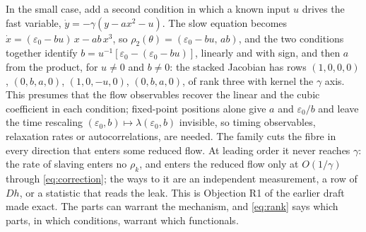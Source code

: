 \documentclass[10pt]{article}
\begin{document}
In the small case, add a second condition in which a known input $u$ drives the fast variable, $\dot y=-\gamma(y-ax^2-u)$. The slow equation becomes $\dot x=(\varepsilon_0-bu)\,x-ab\,x^3$, so $\rho_2(\theta)=(\varepsilon_0-bu,\,ab)$, and the two conditions together identify $b=u^{-1}[\varepsilon_0-(\varepsilon_0-bu)]$, linearly and with sign, and then $a$ from the product, for $u\neq0$ and $b\neq0$: the stacked Jacobian has rows $(1,0,0,0)$, $(0,b,a,0)$, $(1,0,-u,0)$, $(0,b,a,0)$, of rank three with kernel the $\gamma$ axis. This presumes that the flow observables recover the linear and the cubic coefficient in each condition; fixed-point positions alone give $a$ and $\varepsilon_0/b$ and leave the time rescaling $(\varepsilon_0,b)\mapsto\lambda(\varepsilon_0,b)$ invisible, so timing observables, relaxation rates or autocorrelations, are needed. The family cuts the fibre in every direction that enters some reduced flow. At leading order it never reaches $\gamma$: the rate of slaving enters no $\rho_k$, and enters the reduced flow only at $O(1/\gamma)$ through \eqref{eq:correction}; the ways to it are an independent measurement, a row of $Dh$, or a statistic that reads the leak. This is Objection R1 of the earlier draft made exact. The parts can warrant the mechanism, and \eqref{eq:rank} says which parts, in which conditions, warrant which functionals.
\end{document}
